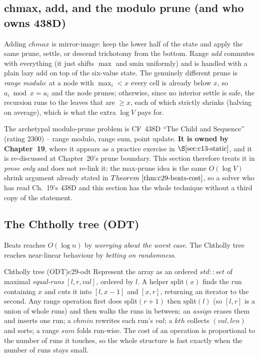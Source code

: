 \subsection{chmax, add, and the modulo prune (and who owns \(\mathbf{438D}\))}

Adding \(\mathit{chmax}\) is mirror-image: keep the lower half of the state and
apply the same prune, settle, or descend trichotomy from the bottom.  Range
\emph{add} commutes with everything (it just shifts \(\max\) and \(\mathrm{smin}\)
uniformly) and is handled with a plain lazy add on top of the six-value state.
The genuinely different prune is \emph{range modulo}: at a node with \(\max_i<x\)
every cell is already below \(x\), so \(a_i\bmod x=a_i\) and the node prunes;
otherwise, since no interior settle is safe, the recursion runs to the leaves that
are \(\ge x\), each of which strictly shrinks (halving on average), which is what
the extra \(\log V\) pays for.

The archetypal modulo-prune problem is CF~438D ``The Child and Sequence'' (rating
2300) -- range modulo, range sum, point update.  \textbf{It is owned by
Chapter~19}, where it appears as a practice exercise in
\(\secref{c13-static}\), and it is re-discussed at Chapter~20's prune boundary.
This section therefore treats it in \emph{prose only} and does not re-link it: the
max-prune idea is the same \(O(\log V)\) shrink argument already stated in
\(\thmref{c29-beats-cost}\), so a solver who has read Ch.~19's 438D and this
section has the whole technique without a third copy of the statement.

\subsection{The Chtholly tree (ODT)}

Beats reaches \(O(\log n)\) by \emph{worrying about the worst case}.  The Chtholly
tree reaches near-linear behaviour by \emph{betting on randomness}.

\begin{definition}{Chtholly tree (ODT)}{c29-odt}
Represent the array as an ordered \(\mathit{std::set}\) of maximal
\emph{equal-runs} \([l,r,\mathit{val}]\), ordered by \(l\).  A helper
\(\mathrm{split}(x)\) finds the run containing \(x\) and cuts it into
\([l,x{-}1]\) and \([x,r]\), returning an iterator to the second.  Any range
operation first does \(\mathrm{split}(r{+}1)\) then \(\mathrm{split}(l)\) (so
\([l,r]\) is a union of whole runs) and then walks the runs in between:
an \emph{assign} erases them and inserts one run; a \(\mathit{chmin}\) rewrites
each run's \(\mathit{val}\); a \(\mathit{kth}\) collects \((\mathit{val},\mathit{len})\)
and sorts; a range \(\mathit{sum}\) folds run-wise.  The cost of an operation is
proportional to the number of runs it touches, so the whole structure is fast
exactly when the number of runs stays small.
\end{definition}

